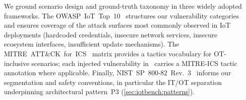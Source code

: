 We ground scenario design and ground-truth taxonomy in three widely adopted
frameworks. The OWASP~IoT~Top~10~\cite{owasp-iot} structures our vulnerability
categories and ensures coverage of the attack surfaces most commonly observed
in IoT deployments (hardcoded credentials, insecure network services,
insecure ecosystem interfaces, insufficient update mechanisms). The
MITRE~ATT\&CK~for~ICS~\cite{mitre-ics} matrix provides a tactics vocabulary
for OT-inclusive scenarios; each injected vulnerability in \systemname\ carries
a MITRE-ICS tactic annotation where applicable. Finally,
NIST~SP~800-82~Rev.~3~\cite{nist80082} informs our segmentation and
safety conventions, in particular the IT/OT separation underpinning
architectural pattern~P3 (\cref{sec:iotbench:patterns}).

